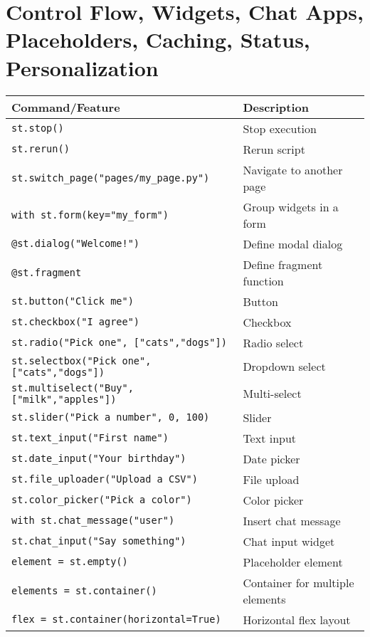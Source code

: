 \documentclass[11pt,a4paper]{article}
\begin{document}
\section*{Control Flow, Widgets, Chat Apps, Placeholders, Caching, Status, Personalization}
\begin{longtable}{|L{8cm}|L{8cm}|}
\hline
\textbf{Command/Feature} & \textbf{Description} \\ \hline
\verb|st.stop()| & Stop execution \\ \hline
\verb|st.rerun()| & Rerun script \\ \hline
\verb|st.switch_page("pages/my_page.py")| & Navigate to another page \\ \hline
\verb|with st.form(key="my_form")| & Group widgets in a form \\ \hline
\verb|@st.dialog("Welcome!")| & Define modal dialog \\ \hline
\verb|@st.fragment| & Define fragment function \\ \hline
\verb|st.button("Click me")| & Button \\ \hline
\verb|st.checkbox("I agree")| & Checkbox \\ \hline
\verb|st.radio("Pick one", ["cats","dogs"])| & Radio select \\ \hline
\verb|st.selectbox("Pick one", ["cats","dogs"])| & Dropdown select \\ \hline
\verb|st.multiselect("Buy", ["milk","apples"])| & Multi-select \\ \hline
\verb|st.slider("Pick a number", 0, 100)| & Slider \\ \hline
\verb|st.text_input("First name")| & Text input \\ \hline
\verb|st.date_input("Your birthday")| & Date picker \\ \hline
\verb|st.file_uploader("Upload a CSV")| & File upload \\ \hline
\verb|st.color_picker("Pick a color")| & Color picker \\ \hline
\verb|with st.chat_message("user")| & Insert chat message \\ \hline
\verb|st.chat_input("Say something")| & Chat input widget \\ \hline
\verb|element = st.empty()| & Placeholder element \\ \hline
\verb|elements = st.container()| & Container for multiple elements \\ \hline
\verb|flex = st.container(horizontal=True)| & Horizontal flex layout \\ \hline

\end{longtable}
\end{document}
